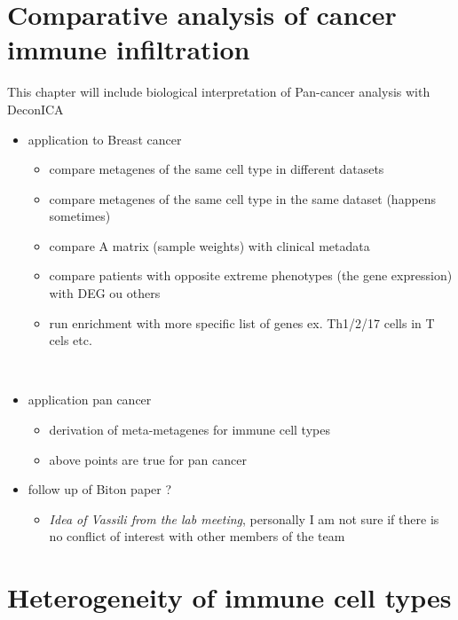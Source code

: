 \documentclass[12pt,]{book}
\providecommand{\tightlist}{%
  \setlength{\itemsep}{0pt}\setlength{\parskip}{0pt}}
\theoremstyle{definition}
\theoremstyle{definition}
\theoremstyle{definition}
\theoremstyle{remark}
\begin{document}


\hypertarget{results}{%
\chapter{Comparative analysis of cancer immune
infiltration}\label{results}}

This chapter will include biological interpretation of Pan-cancer
analysis with DeconICA

\begin{itemize}
\item
  application to Breast cancer

  \begin{itemize}
  \item
    compare metagenes of the same cell type in different datasets
  \item
    compare metagenes of the same cell type in the same dataset (happens
    sometimes)
  \item
    compare A matrix (sample weights) with clinical metadata
  \item
    compare patients with opposite extreme phenotypes (the gene
    expression) with DEG ou others
  \item
    run enrichment with more specific list of genes ex. Th1/2/17 cells
    in T cels etc.

    ​
  \end{itemize}
\item
  application pan cancer

  \begin{itemize}
  \tightlist
  \item
    derivation of meta-metagenes for immune cell types
  \item
    above points are true for pan cancer
  \end{itemize}
\item
  follow up of Biton paper ?

  \begin{itemize}
  \tightlist
  \item
    \emph{Idea of Vassili from the lab meeting}, personally I am not
    sure if there is no conflict of interest with other members of the
    team
  \end{itemize}
\end{itemize}

\hypertarget{map}{%
\chapter{Heterogeneity of immune cell types}\label{map}}
\end{document}
